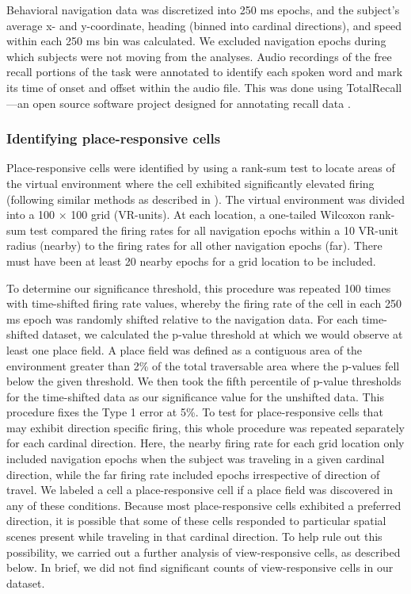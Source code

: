Behavioral navigation data was discretized into 250 ms epochs, and the subject's average x- and y-coordinate, heading (binned into cardinal directions), and speed within each 250 ms bin was calculated. We excluded navigation epochs during which subjects were not moving from the analyses. Audio recordings of the free recall portions of the task were annotated to identify each spoken word and mark its time of onset and offset within the audio file.  This was done using TotalRecall---an open source software project designed for annotating recall data \cite{SolwEtal10}.

\subsubsection*{Identifying place-responsive cells} Place-responsive cells were identified by using a rank-sum test to locate areas of the virtual environment where the cell exhibited significantly elevated firing (following similar methods as described in \cite{JacoEtal10}). The virtual environment was divided into a 100 $\times$ 100 grid (VR-units). At each location, a one-tailed Wilcoxon rank-sum test compared the firing rates for all navigation epochs within a 10 VR-unit radius (nearby) to the firing rates for all other navigation epochs (far). There must have been at least 20 nearby epochs for a grid location to be included.  

To determine our significance threshold, this procedure was repeated 100 times with time-shifted firing rate values, whereby the firing rate of the cell in each 250 ms epoch was randomly shifted relative to the navigation data. For each time-shifted dataset, we calculated the p-value threshold at which we would observe at least one place field. A place field was defined as a contiguous area of the environment greater than 2\% of the total traversable area where the p-values fell below the given threshold. We then took the fifth percentile of p-value thresholds for the time-shifted data as our significance value for the unshifted data. This procedure fixes the Type 1 error at 5\%.  To test for place-responsive cells that may exhibit direction specific firing, this whole procedure was repeated separately for each cardinal direction. Here, the nearby firing rate for each grid location only included navigation epochs when the subject was traveling in a given cardinal direction, while the far firing rate included epochs irrespective of direction of travel. We labeled a cell a place-responsive cell if a place field was discovered in any of these conditions.  Because most place-responsive cells exhibited a preferred direction, it is possible that some of these cells responded to particular spatial scenes present while traveling in that cardinal direction.  To help rule out this possibility, we carried out a further analysis of view-responsive cells, as described below.  In brief, we did not find significant counts of view-responsive cells in our dataset.

